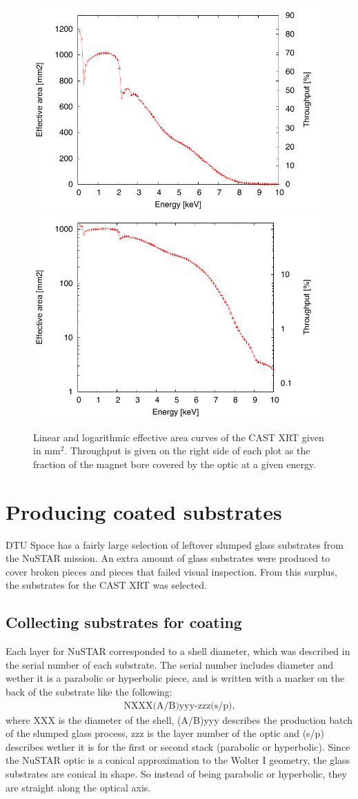 \begin{figure}[htbp]
  \centering
  \includegraphics[width=0.47\linewidth]{figures/cast/pt-c_effara_throughput_lin.pdf}
  \includegraphics[width=0.47\linewidth]{figures/cast/pt-c_effara_throughput_log.pdf}
  \caption{\footnotesize Linear and logarithmic effective area curves of the CAST XRT given in mm$^2$. Throughput is given on the right side of each plot as the fraction of the magnet bore covered by the optic at a given energy.}
  \label{fig:pt-c_effarea_throughput}
\end{figure}

\section{Producing coated substrates}
DTU Space has a fairly large selection of leftover slumped glass substrates from the NuSTAR mission. An extra amount of glass substrates were produced to cover broken pieces and pieces that failed visual inspection. From this surplus, the substrates for the CAST XRT was selected.

\subsection{Collecting substrates for coating}
Each layer for NuSTAR corresponded to a shell diameter, which was described in the serial number of each substrate. The serial number includes diameter and wether it is a parabolic or hyperbolic piece, and is written with a marker on the back of the substrate like the following:
\begin{eqnarray}
  \text{NXXX(A/B)yyy-zzz(s/p),}\nonumber
\end{eqnarray}
where XXX is the diameter of the shell, (A/B)yyy describes the production batch of the slumped glass process, zzz is the layer number of the optic and (s/p) describes wether it is for the first or second stack (parabolic or hyperbolic). Since the NuSTAR optic is a conical approximation to the Wolter I geometry, the glass substrates are conical in shape. So instead of being parabolic or hyperbolic, they are straight along the optical axis.

